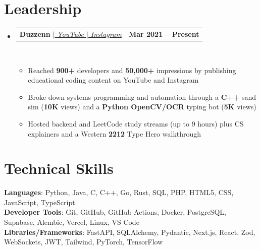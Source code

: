 \documentclass[letterpaper,10pt]{article}
\makeatletter
\newcommand{\resumeItem}[1]{
  \item\small{
    {#1 \vspace{0pt}}
  }
}
\newcommand{\resumeProjectHeading}[2]{
    \item
    \begin{tabular*}{1.001\textwidth}{l@{\extracolsep{\fill}}r}
      \small#1 & \textbf{\small #2}\\
    \end{tabular*}\vspace{0.5pt}
}
\newcommand{\resumeSubHeadingListStart}{\begin{itemize}[leftmargin=0.0in, label={}, itemsep=2pt, parsep=0pt, topsep=0pt, partopsep=0pt]}
\newcommand{\resumeSubHeadingListEnd}{\end{itemize}\vspace{0pt}}
\newcommand{\resumeItemListStart}{\begin{itemize}[itemsep=0.6pt, parsep=0pt, topsep=0.4pt, partopsep=0pt]}
\newcommand{\resumeItemListEnd}{\end{itemize}\vspace{-1pt}}
\makeatother
\begin{document}
\section{Leadership}
    \resumeSubHeadingListStart
                   \resumeProjectHeading
            {\textbf{{Duzzenn}} $|$\emph{{\href{https://www.youtube.com/@Duzzenn}{ YouTube $|$}\href{https://www.instagram.com/david_anukam/}{ Instagram}}}}{Mar 2021 -- Present}
            \\[1mm]
          \resumeItemListStart
            \resumeItem{Reached \textbf{900+} developers and \textbf{50,000+} impressions by publishing educational coding content on YouTube and Instagram}
            \resumeItem{Broke down systems programming and automation through a \textbf{C++} sand sim (\textbf{10K} views) and a \textbf{Python OpenCV/OCR} typing bot (\textbf{5K} views)}
            \resumeItem{Hosted backend and LeetCode study streams (up to 9 hours) plus CS explainers and a Western \textbf{2212} Type Hero walkthrough}
          \resumeItemListEnd
          \resumeSubHeadingListEnd
 \vspace{2pt}
\section{Technical Skills}
 \begin{itemize}[leftmargin=0.15in, label={}, itemsep=1pt, parsep=0pt, topsep=1pt]
    \small{\item{
     \textbf{Languages}{: Python, Java, C, C++, Go, Rust, SQL, PHP, HTML5, CSS, JavaScript, TypeScript} \\[0.6mm]
     \textbf{Developer Tools}{: Git, GitHub, GitHub Actions, Docker, PostgreSQL, Supabase, Alembic, Vercel, Linux, VS Code} \\[0.6mm]
     \textbf{Libraries/Frameworks}{: FastAPI, SQLAlchemy, Pydantic, Next.js, React, Zod, WebSockets, JWT, Tailwind, PyTorch, TensorFlow}
    }}
 \end{itemize}
\end{document}
